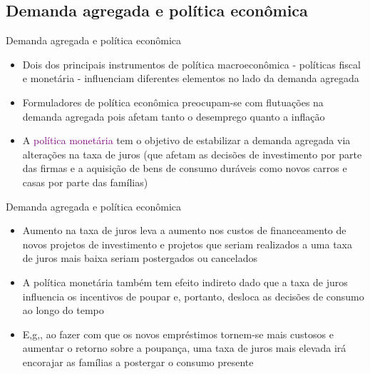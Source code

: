 \documentclass[10pt]{beamer}
\begin{document}
\subsection{Demanda agregada e política econômica}
\begin{frame}{Demanda agregada e política econômica}
    \begin{itemize}
        \item Dois dos principais instrumentos de política macroeconômica - políticas fiscal e monetária - influenciam diferentes elementos no lado da demanda agregada\bigskip
         
        \item Formuladores de política econômica preocupam-se com flutuações na demanda agregada pois afetam tanto o desemprego quanto a inflação\bigskip
         
        \item A \textcolor{purple}{política monetária} tem o objetivo de estabilizar a demanda agregada via alterações na taxa de juros (que afetam as decisões de investimento por parte das firmas e a aquisição de bens de consumo duráveis como novos carros e casas por parte das famílias)
    \end{itemize}
\end{frame}

\begin{frame}{Demanda agregada e política econômica}
    \begin{itemize}
        \item Aumento na taxa de juros leva a aumento nos custos de financeamento de novos projetos de investimento e projetos que seriam realizados a uma taxa de juros mais baixa seriam postergados ou cancelados\bigskip
         
        \item A política monetária também tem efeito indireto dado que a taxa de juros influencia os incentivos de poupar e, portanto, desloca as decisões de consumo ao longo do tempo\bigskip
         
        \item E,g,, ao fazer com que os novos empréstimos tornem-se mais custosos e aumentar o retorno sobre a poupança, uma taxa de juros mais elevada irá encorajar as famílias a postergar o consumo presente
    \end{itemize}
\end{frame}
\end{document}
